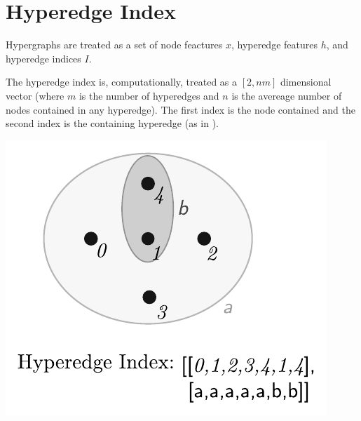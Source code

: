 \documentclass[]{article}
\begin{document}
\section{Hyperedge Index}
Hypergraphs are treated as a set of node feactures $x$, hyperedge features $h$, and hyperedge indices $I$. 

The hyperedge index is, computationally, treated as a $[2,nm]$ dimensional vector (where $m$ is the number of hyperedges and $n$ is the avereage number of nodes contained in any hyperedge). 
The first index is the node contained and the second index is the containing hyperedge (as in \cite{hypergraphconv}).
\begin{center}
	\includegraphics[scale = 1]{hyperedge_index.pdf}
\end{center}

\end{document}

